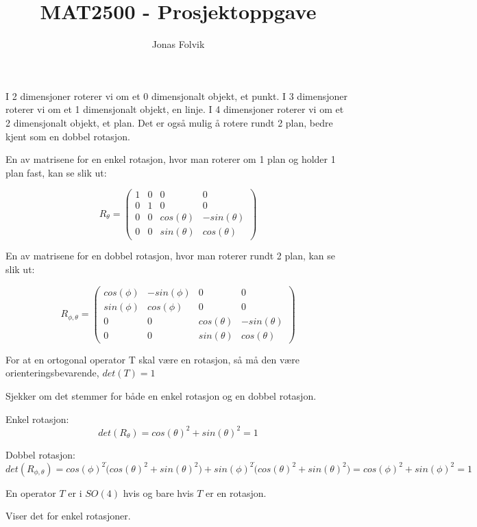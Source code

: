 \documentclass[a4paper,10pt,english]{article}
\title{MAT2500 - Prosjektoppgave}
\author{Jonas Folvik}
\begin{document}
    
    \maketitle
    
    I 2 dimensjoner roterer vi om et 0 dimensjonalt objekt, et punkt. I 3 dimensjoner roterer vi om et 1 dimensjonalt objekt, en linje.
    I 4 dimensjoner roterer vi om et 2 dimensjonalt objekt, et plan. Det er også mulig å rotere rundt 2 plan, bedre kjent som en dobbel rotasjon.

    En av matrisene for en enkel rotasjon, hvor man roterer om 1 plan og holder 1 plan fast, kan se slik ut:

    $$R_{\theta} = \left(
    \begin{matrix}
        1 & 0 & 0 & 0 \\
        0 & 1 & 0 & 0 \\
        0 & 0 & cos(\theta) & -sin(\theta) \\
        0 & 0 & sin(\theta) &  cos(\theta)
    \end{matrix}
    \right)$$

    En av matrisene for en dobbel rotasjon, hvor man roterer rundt 2 plan, kan se slik ut:

    $$
    R_{\phi, \theta} = \left(
    \begin{matrix}
        cos(\phi) & -sin(\phi) & 0 & 0 \\
        sin(\phi) &  cos(\phi) & 0 & 0 \\
        0 & 0 & cos(\theta) & -sin(\theta) \\
        0 & 0 & sin(\theta) &  cos(\theta)
    \end{matrix}
    \right)$$

    For at en ortogonal operator T skal være en rotasjon, så må den være orienteringsbevarende, $det(T) = 1$

    Sjekker om det stemmer for både en enkel rotasjon og en dobbel rotasjon.

    Enkel rotasjon:
    $$
    det(R_{\theta}) = cos(\theta)^{2} + sin(\theta)^{2} = 1
    $$

    Dobbel rotasjon:
    $$
    det(R_{\phi, \theta}) = cos(\phi)^{2} \dot (cos(\theta)^{2} + sin(\theta)^{2}) + sin(\phi)^{2} \dot (cos(\theta)^{2} + sin(\theta)^{2}) = cos(\phi)^{2} + sin(\phi)^{2} = 1
    $$

    En operator $T$ er i $SO(4)$ hvis og bare hvis $T$ er en rotasjon.

    Viser det for enkel rotasjoner.
\end{document}
